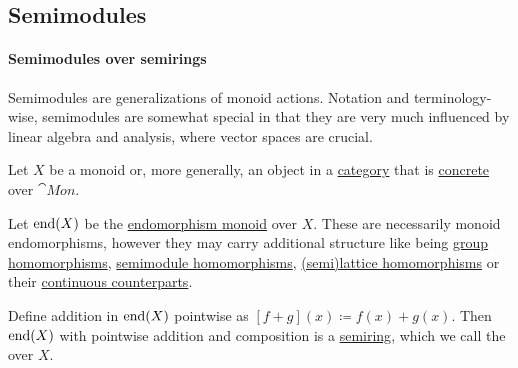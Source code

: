 \subsection{Semimodules}\label{subsec:semimodules}

\paragraph{Semimodules over semirings}

Semimodules are generalizations of monoid actions. Notation and terminology-wise, semimodules are somewhat special in that they are very much influenced by linear algebra and analysis, where vector spaces are crucial.

\begin{definition}\label{def:endomorphism_semiring}\mimprovised
  Let \( X \) be a monoid or, more generally, an object in a \hyperref[def:category]{category} that is \hyperref[def:concrete_category]{concrete} over \hyperref[def:monoid/category]{\( \cat{Mon} \)}.

  Let \( \operatorname{end}(X) \) be the \hyperref[def:endomorphism_monoid]{endomorphism monoid} over \( X \). These are necessarily monoid endomorphisms, however they may carry additional structure like being \hyperref[def:group/homomorphism]{group homomorphisms}, \hyperref[def:semimodule/homomorphism]{semimodule homomorphisms}, \hyperref[def:lattice/homomorphism]{(semi)lattice homomorphisms} or their \hyperref[rem:topological_first_order_structures]{continuous counterparts}.

  Define addition in \( \operatorname{end}(X) \) pointwise as \( [f + g](x) \coloneqq f(x) + g(x) \). Then \( \operatorname{end}(X) \) with pointwise addition and composition is a \hyperref[def:semiring]{semiring}, which we call the  over \( X \).
\end{definition}

